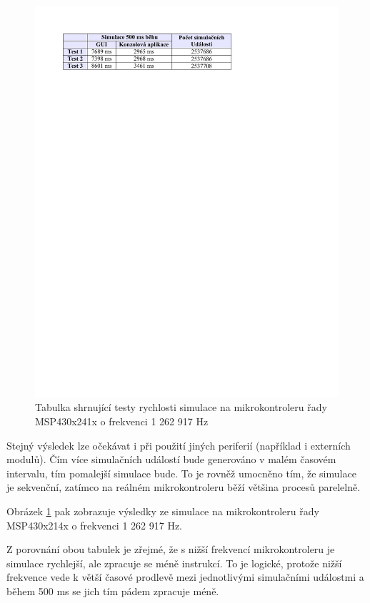 \begin{figure}[ht]
\centering
\includegraphics[trim=0cm 23.5cm 2cm 2cm]{fig/tabulka2}
\caption{Tabulka shrnující testy rychlosti simulace na mikrokontroleru řady MSP430x241x o frekvenci 1 262 917 Hz}
\label{fig:tabulka2}
\end{figure}

Stejný výsledek lze očekávat i při použití jiných periferií (například i externích modulů). Čím více simulačních událostí bude generováno v malém časovém intervalu, tím pomalejší simulace bude. To je rovněž umocněno tím, že simulace je sekvenční, zatímco na reálném mikrokontroleru běží většina procesů parelelně.

Obrázek \ref{fig:tabulka2} pak zobrazuje výsledky ze simulace na mikrokontroleru řady MSP430x214x o frekvenci 1 262 917 Hz.

Z porovnání obou tabulek je zřejmé, že s nižší frekvencí mikrokontroleru je simulace rychlejší, ale zpracuje se méně instrukcí. To je logické, protože nižší frekvence vede k větší časové prodlevě mezi jednotlivými simulačními událostmi a během 500 ms se jich tím pádem zpracuje méně.

